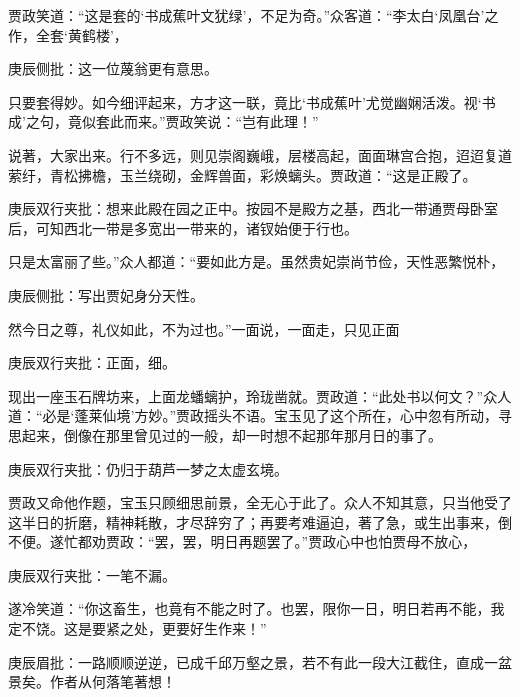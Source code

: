 \begin{parag}

    贾政笑道：“这是套的‘书成蕉叶文犹绿’，不足为奇。”众客道：“李太白‘凤凰台’之作，全套‘黄鹤楼’，\begin{note}庚辰侧批：这一位蔑翁更有意思。\end{note}只要套得妙。如今细评起来，方才这一联，竟比‘书成蕉叶’尤觉幽娴活泼。视‘书成’之句，竟似套此而来。”贾政笑说：“岂有此理！”
\end{parag}


\begin{parag}


    说著，大家出来。行不多远，则见崇阁巍峨，层楼高起，面面琳宫合抱，迢迢复道萦纡，青松拂檐，玉兰绕砌，金辉兽面，彩焕螭头。贾政道：“这是正殿了。\begin{note}庚辰双行夹批：想来此殿在园之正中。按园不是殿方之基，西北一带通贾母卧室后，可知西北一带是多宽出一带来的，诸钗始便于行也。\end{note}只是太富丽了些。”众人都道：“要如此方是。虽然贵妃崇尚节俭，天性恶繁悦朴，\begin{note}庚辰侧批：写出贾妃身分天性。\end{note}然今日之尊，礼仪如此，不为过也。”一面说，一面走，只见正面\begin{note}庚辰双行夹批：正面，细。\end{note}现出一座玉石牌坊来，上面龙蟠螭护，玲珑凿就。贾政道：“此处书以何文？”众人道：“必是‘蓬莱仙境’方妙。”贾政摇头不语。宝玉见了这个所在，心中忽有所动，寻思起来，倒像在那里曾见过的一般，却一时想不起那年那月日的事了。\begin{note}庚辰双行夹批：仍归于葫芦一梦之太虚玄境。\end{note}贾政又命他作题，宝玉只顾细思前景，全无心于此了。众人不知其意，只当他受了这半日的折磨，精神耗散，才尽辞穷了；再要考难逼迫，著了急，或生出事来，倒不便。遂忙都劝贾政：“罢，罢，明日再题罢了。”贾政心中也怕贾母不放心，\begin{note}庚辰双行夹批：一笔不漏。\end{note}遂冷笑道：“你这畜生，也竟有不能之时了。也罢，限你一日，明日若再不能，我定不饶。这是要紧之处，更要好生作来！”\begin{note}庚辰眉批：一路顺顺逆逆，已成千邱万壑之景，若不有此一段大江截住，直成一盆景矣。作者从何落笔著想！\end{note}
\end{parag}


